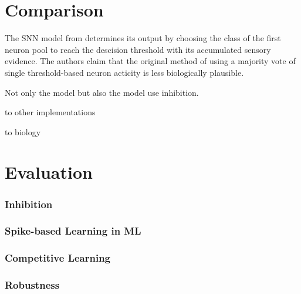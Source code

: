 \section{Comparison}
\label{sec:comparison}

The \ac{SNN} model from \cite{STDP_like} determines its output by 
choosing the class of the first neuron pool to reach the descision threshold with its accumulated sensory evidence.
The authors claim that the original method of using a majority vote of single threshold-based neuron acticity is less biologically plausible.

Not only the \cite{STDP_like} model but also the \cite{SNN} model use inhibition.

to other implementations

to biology


\section{Evaluation}
\label{sec:evaluation}

\subsubsection{Inhibition}

\subsubsection{Spike-based Learning in ML}

\subsubsection{Competitive Learning}

\subsubsection{Robustness}